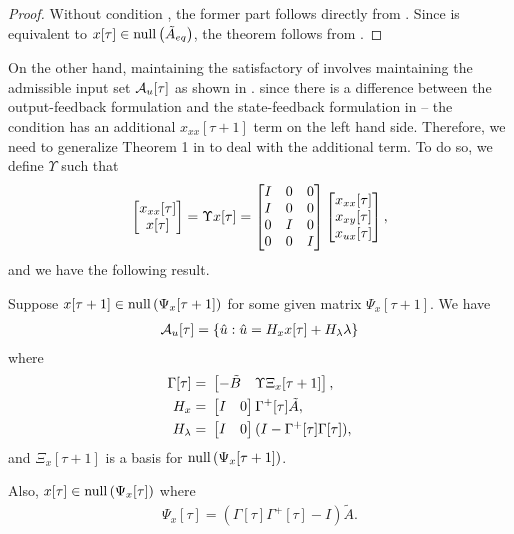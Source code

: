 \begin{proof}
Without condition , the former part follows directly from \cite[Corollary 1]{tseng2020system}. Since  is equivalent to $x[\tau] \in \text{\rm null}\left(\tilde{A}_{eq}\right)$, the theorem follows from .
\end{proof}

\iffalse
On the other hand, maintaining the satisfactory of  involves maintaining the admissible input set $\mathcal{A}_u[\tau]$ as shown in \cite{tseng2020system}.   since there is a difference between the output-feedback formulation  and the state-feedback formulation in \cite{tseng2020system} -- the condition  has an additional $x_{xx}[\tau + 1]$ term on the left hand side. Therefore, we need to generalize Theorem 1 in \cite{tseng2020system} to deal with the additional term. To do so, we define $\Upsilon$ such that
\begin{align}
\begin{bmatrix}
x_{xx}[\tau]\\
x[\tau]
\end{bmatrix} 
= \Upsilon x[\tau] 
= \begin{bmatrix}
I & 0 & 0\\
I & 0 & 0\\
0 & I & 0\\
0 & 0 & I
\end{bmatrix} 
\begin{bmatrix}
x_{xx}[\tau]\\
x_{xy}[\tau]\\
x_{ux}[\tau]
\end{bmatrix},
\label{eqn:Upsilon-X}
\end{align}
and we have the following result.

\begin{corollary}\label{cor:feasible_set}
  Suppose $x[\tau+1] \in \text{\rm null}\left(\Psi_x[\tau+1]\right)$ for some given matrix $\Psi_x[\tau+1]$. We have 
  \begin{align*}
    \mathcal{A}_u[\tau] = \{ \hat{u} : \hat{u} = H_x x[\tau] + H_\lambda \lambda \}
  \end{align*}
  where 
  \begin{align*}
    \Gamma[\tau] =&\ \begin{bmatrix}-\tilde{B} & \Upsilon \Xi_x[\tau + 1]\end{bmatrix}, \\
    H_x =&\ \begin{bmatrix}I & 0\end{bmatrix} \Gamma^+[\tau] \tilde{A}, \\
    H_\lambda =&\ \begin{bmatrix}I & 0\end{bmatrix} (I - \Gamma^+[\tau] \Gamma[\tau]),
  \end{align*}
  and $\Xi_x[\tau+1]$ is a basis for $\text{\rm null}\left(\Psi_x[\tau+1]\right)$.

  Also, $x[\tau] \in \text{\rm null}\left(\Psi_x[\tau]\right)$ where 
  \begin{align*}
    \Psi_x[\tau] = (\Gamma[\tau] \Gamma^+[\tau] - I)\tilde{A}.
  \end{align*}
\end{corollary}

